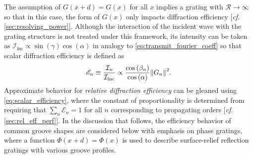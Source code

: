 The assumption of $G (x+d) = G (x)$ for all $x$ implies a grating with $\mathscr{R} \to \infty$ so that in this case, the form of $G (x)$ only impacts diffraction efficiency [\emph{cf.\@} \cref{sec:resolving_power}]. 
Although the interaction of the incident wave with the grating structure is not treated under this framework, its intensity can be taken as $\mathcal{I}_{\text{inc}} \propto \sin \left( \gamma \right) \cos \left( \alpha \right)$ in analogy to \cref{eq:transmit_fourier_coeff} so that scalar diffraction efficiency is defined as 
\begin{equation}\label{eq:scalar_efficiency}
 \mathscr{E}_n \equiv \frac{\mathcal{I}_n}{\mathcal{I}_{\text{inc}}} \propto \frac{\cos \left( \beta_n \right)}{\cos \left( \alpha \right)} \norm{G_n}^2 .
 \end{equation}
Approximate behavior for \emph{relative diffraction efficiency} can be gleaned using \cref{eq:scalar_efficiency}, where the constant of proportionality is determined from requiring that $\sum_n \mathscr{E}_n = 1$ for all $n$ corresponding to propagating orders [\emph{cf.\@} \cref{sec:rel_eff_perf}]. 
In the discussion that follows, the efficiency behavior of common groove shapes are considered below with emphasis on phase gratings, where a function $\Phi (x+d) = \Phi (x)$ is used to describe surface-relief reflection gratings with various groove profiles. 

